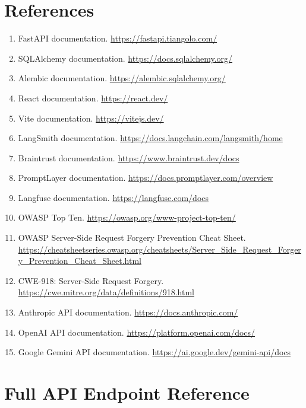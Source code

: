 \documentclass[12pt,a4paper]{report}
\begin{document}
\chapter{References}

\begin{enumerate}
  \item FastAPI documentation. \url{https://fastapi.tiangolo.com/}
  \item SQLAlchemy documentation. \url{https://docs.sqlalchemy.org/}
  \item Alembic documentation. \url{https://alembic.sqlalchemy.org/}
  \item React documentation. \url{https://react.dev/}
  \item Vite documentation. \url{https://vitejs.dev/}
  \item LangSmith documentation. \url{https://docs.langchain.com/langsmith/home}
  \item Braintrust documentation. \url{https://www.braintrust.dev/docs}
  \item PromptLayer documentation. \url{https://docs.promptlayer.com/overview}
  \item Langfuse documentation. \url{https://langfuse.com/docs}
  \item OWASP Top Ten. \url{https://owasp.org/www-project-top-ten/}
  \item OWASP Server-Side Request Forgery Prevention Cheat Sheet. \url{https://cheatsheetseries.owasp.org/cheatsheets/Server_Side_Request_Forgery_Prevention_Cheat_Sheet.html}
  \item CWE-918: Server-Side Request Forgery. \url{https://cwe.mitre.org/data/definitions/918.html}
  \item Anthropic API documentation. \url{https://docs.anthropic.com/}
  \item OpenAI API documentation. \url{https://platform.openai.com/docs/}
  \item Google Gemini API documentation. \url{https://ai.google.dev/gemini-api/docs}
\end{enumerate}

\appendix

\chapter{Full API Endpoint Reference}
\end{document}
